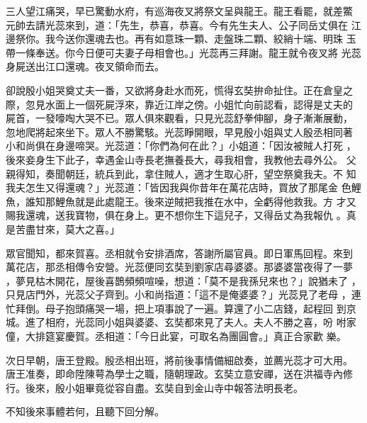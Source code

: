 \begin{pinyinscope}
{三人望江痛哭，早已驚動水府，有巡海夜叉將祭文呈與龍王。龍王看罷，就差鱉
元帥去請光蕊來到，道：「先生，恭喜，恭喜。今有先生夫人、公子同岳丈俱在
江邊祭你。我今送你還魂去也。再有如意珠一顆、走盤珠二顆、絞綃十端、明珠
玉帶一條奉送。你今日便可夫妻子母相會也。」光蕊再三拜謝。龍王就令夜叉將
光蕊身屍送出江口還魂。夜叉領命而去。

卻說殷小姐哭奠丈夫一番，又欲將身赴水而死，慌得玄奘拚命扯住。正在倉皇之
際，忽見水面上一個死屍浮來，靠近江岸之傍。小姐忙向前認看，認得是丈夫的
屍首，一發嚎啕大哭不已。眾人俱來觀看，只見光蕊舒拳伸腳，身子漸漸展動，
忽地爬將起來坐下。眾人不勝驚駭。光蕊睜開眼，早見殷小姐與丈人殷丞相同著
小和尚俱在身邊啼哭。光蕊道：「你們為何在此？」小姐道：「因汝被賊人打死
，後來妾身生下此子，幸遇金山寺長老撫養長大，尋我相會，我教他去尋外公。
父親得知，奏聞朝廷，統兵到此，拿住賊人，適才生取心肝，望空祭奠我夫。不
知我夫怎生又得還魂？」光蕊道：「皆因我與你昔年在萬花店時，買放了那尾金
色鯉魚，誰知那鯉魚就是此處龍王。後來逆賊把我推在水中，全虧得他救我。方
才又賜我還魂，送我寶物，俱在身上。更不想你生下這兒子，又得岳丈為我報仇
。真是苦盡甘來，莫大之喜。」

眾官聞知，都來賀喜。丞相就令安排酒席，答謝所屬官員。即日軍馬回程。來到
萬花店，那丞相傳令安營。光蕊便同玄奘到劉家店尋婆婆。那婆婆當夜得了一夢
，夢見枯木開花，屋後喜鵲頻頻喧噪，想道：「莫不是我孫兒來也？」說猶未了
，只見店門外，光蕊父子齊到。小和尚指道：「這不是俺婆婆？」光蕊見了老母
，連忙拜倒。母子抱頭痛哭一場，把上項事說了一遍。算還了小二店錢，起程回
到京城。進了相府，光蕊同小姐與婆婆、玄奘都來見了夫人。夫人不勝之喜，吩
咐家僮，大排筵宴慶賀。丞相道：「今日此宴，可取名為團圓會。」真正合家歡
樂。

次日早朝，唐王登殿。殷丞相出班，將前後事情備細啟奏，並薦光蕊才可大用。
唐王准奏，即命陞陳萼為學士之職，隨朝理政。玄奘立意安禪，送在洪福寺內修
行。後來，殷小姐畢竟從容自盡。玄奘自到金山寺中報答法明長老。

    不知後來事體若何，且聽下回分解。





}
\end{pinyinscope}
